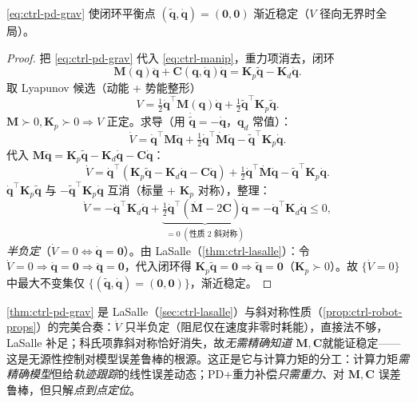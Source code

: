 \begin{theorem}[PD + 重力补偿的渐近稳定性]
\label{thm:ctrl-pd-grav}
\cref{eq:ctrl-pd-grav} 使闭环平衡点 $(\tilde{\mathbf{q}},\dot{\mathbf{q}})=(\mathbf{0},\mathbf{0})$ 渐近稳定（$V$ 径向无界时全局）。
\end{theorem}
\begin{proof}
把 \cref{eq:ctrl-pd-grav} 代入 \cref{eq:ctrl-manip}，重力项消去，闭环
\[
  \mathbf{M}(\mathbf{q})\ddot{\mathbf{q}}+\mathbf{C}(\mathbf{q},\dot{\mathbf{q}})\dot{\mathbf{q}}=\mathbf{K}_p\tilde{\mathbf{q}}-\mathbf{K}_d\dot{\mathbf{q}}.
\]
取 Lyapunov 候选（动能 + 势能整形）
\[
  V=\tfrac12\dot{\mathbf{q}}^\top\mathbf{M}(\mathbf{q})\dot{\mathbf{q}}+\tfrac12\tilde{\mathbf{q}}^\top\mathbf{K}_p\tilde{\mathbf{q}}.
\]
$\mathbf{M}\succ0,\mathbf{K}_p\succ0\Rightarrow V$ 正定。求导（用 $\dot{\tilde{\mathbf{q}}}=-\dot{\mathbf{q}}$，$\mathbf{q}_d$ 常值）：
\[
  \dot V=\dot{\mathbf{q}}^\top\mathbf{M}\ddot{\mathbf{q}}+\tfrac12\dot{\mathbf{q}}^\top\dot{\mathbf{M}}\dot{\mathbf{q}}-\tilde{\mathbf{q}}^\top\mathbf{K}_p\dot{\mathbf{q}}.
\]
代入 $\mathbf{M}\ddot{\mathbf{q}}=\mathbf{K}_p\tilde{\mathbf{q}}-\mathbf{K}_d\dot{\mathbf{q}}-\mathbf{C}\dot{\mathbf{q}}$：
\[
  \dot V=\dot{\mathbf{q}}^\top(\mathbf{K}_p\tilde{\mathbf{q}}-\mathbf{K}_d\dot{\mathbf{q}}-\mathbf{C}\dot{\mathbf{q}})+\tfrac12\dot{\mathbf{q}}^\top\dot{\mathbf{M}}\dot{\mathbf{q}}-\tilde{\mathbf{q}}^\top\mathbf{K}_p\dot{\mathbf{q}}.
\]
$\dot{\mathbf{q}}^\top\mathbf{K}_p\tilde{\mathbf{q}}$ 与 $-\tilde{\mathbf{q}}^\top\mathbf{K}_p\dot{\mathbf{q}}$ 互消（标量 + $\mathbf{K}_p$ 对称），整理：
\[
  \dot V=-\dot{\mathbf{q}}^\top\mathbf{K}_d\dot{\mathbf{q}}+\underbrace{\tfrac12\dot{\mathbf{q}}^\top(\dot{\mathbf{M}}-2\mathbf{C})\dot{\mathbf{q}}}_{=0\;(\text{性质 2 斜对称})}=-\dot{\mathbf{q}}^\top\mathbf{K}_d\dot{\mathbf{q}}\le0,
\]
\emph{半负定}（$\dot V=0\iff\dot{\mathbf{q}}=\mathbf{0}$）。由 LaSalle（\cref{thm:ctrl-lasalle}）：令 $\dot V=0\Rightarrow\dot{\mathbf{q}}=\mathbf{0}\Rightarrow\ddot{\mathbf{q}}=\mathbf{0}$，代入闭环得 $\mathbf{K}_p\tilde{\mathbf{q}}=\mathbf{0}\Rightarrow\tilde{\mathbf{q}}=\mathbf{0}$（$\mathbf{K}_p\succ0$）。故 $\{\dot V=0\}$ 中最大不变集仅 $\{(\tilde{\mathbf{q}},\dot{\mathbf{q}})=(\mathbf{0},\mathbf{0})\}$，渐近稳定。
\end{proof}

\begin{insight}
\cref{thm:ctrl-pd-grav} 是 LaSalle（\cref{sec:ctrl-lasalle}）与斜对称性质（\cref{prop:ctrl-robot-props}）的完美合奏：$\dot V$ 只半负定（阻尼仅在速度非零时耗能），直接法不够，LaSalle 补足；科氏项靠斜对称恰好消失，故\emph{无需精确知道 $\mathbf{M},\mathbf{C}$}就能证稳定——这是无源性控制对模型误差鲁棒的根源。这正是它与计算力矩的分工：计算力矩\emph{需精确模型}但给\emph{轨迹跟踪}的线性误差动态；PD+重力补偿\emph{只需重力}、对 $\mathbf{M},\mathbf{C}$ 误差鲁棒，但只解\emph{点到点定位}。
\end{insight}

